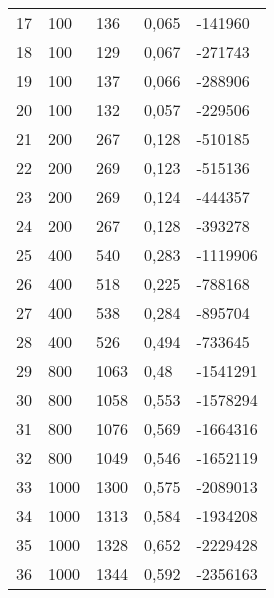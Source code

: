 \begin{longtable}{lllll}
    17               & 100            & 136            & 0,065       & -141960         \\
    18               & 100            & 129            & 0,067       & -271743         \\
    19               & 100            & 137            & 0,066       & -288906         \\
    20               & 100            & 132            & 0,057       & -229506         \\
    21               & 200            & 267            & 0,128       & -510185         \\
    22               & 200            & 269            & 0,123       & -515136         \\
    23               & 200            & 269            & 0,124       & -444357         \\
    24               & 200            & 267            & 0,128       & -393278         \\
    25               & 400            & 540            & 0,283       & -1119906        \\
    26               & 400            & 518            & 0,225       & -788168         \\
    27               & 400            & 538            & 0,284       & -895704         \\
    28               & 400            & 526            & 0,494       & -733645         \\
    29               & 800            & 1063           & 0,48        & -1541291        \\
    30               & 800            & 1058           & 0,553       & -1578294        \\
    31               & 800            & 1076           & 0,569       & -1664316        \\
    32               & 800            & 1049           & 0,546       & -1652119        \\
    33               & 1000           & 1300           & 0,575       & -2089013        \\
    34               & 1000           & 1313           & 0,584       & -1934208        \\
    35               & 1000           & 1328           & 0,652       & -2229428        \\
    36               & 1000           & 1344           & 0,592       & -2356163        \\

\end{longtable}
